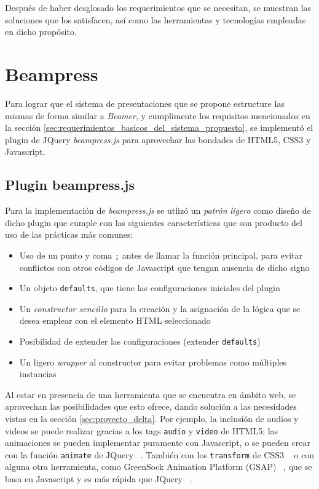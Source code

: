 	Después de haber desglosado los requerimientos que se necesitan, se muestran las soluciones que los satisfacen, así como las herramientas y tecnologías empleadas en dicho propósito. 

	\section{Beampress} %
	\label{sec:beampress}
		Para lograr que el sistema de presentaciones que se propone estructure las mismas de forma similar a \textit{Beamer}, y cumplimente los requisitos mencionados en la sección \ref{sec:requerimientos_basicos_del_sistema_propuesto}, se implementó el plugin de JQuery \textit{beampress.js} para aprovechar las bondades de HTML5, CSS3 y Javascript.

		\subsection{Plugin beampress.js} %
		\label{sub:beampress_js}
			 Para la implementación de \textit{beampress.js} se utlizó un  \textit{patrón ligero} como diseño de dicho plugin \cite{smashingmagazine} que cumple con las siguientes características que son producto del uso de las prácticas más comunes:

			\begin{itemize}
				\item Uso de un punto y coma \texttt{;} antes de llamar la función principal, para evitar conflictos con otros códigos de Javascript que tengan ausencia de dicho signo
				\item Un objeto \texttt{defaults}, que tiene las configuraciones iniciales del plugin
				\item Un \textit{constructor sencillo} para la creación y la asignación de la lógica que se desea emplear con el elemento HTML seleccionado
				\item Posibilidad de extender las configuraciones (extender \texttt{defaults})
				\item Un ligero \textit{wrapper} al constructor para evitar problemas como múltiples instancias
			\end{itemize}		


		Al estar en presencia de una herramienta que se encuentra en ámbito web, se aprovechan las posibilidades que esto ofrece, dando solución a las necesidades vistas en la sección \ref{sec:proyecto_delta}. Por ejemplo, la inclusión de audios y videos se puede realizar gracias a los tags \texttt{audio} y \texttt{video} de HTML5; las animaciones se pueden implementar puramente con Javascript, o se pueden crear con la función \texttt{animate} de JQuery ~\cite{animate}. También con los \texttt{transform} de CSS3 ~\cite{csstransform} o con alguna otra herramienta, como GreenSock Animation Platform (GSAP) ~\cite{gsap}, que se basa en Javascript y es más rápida que JQuery ~\cite{jquery}. 


